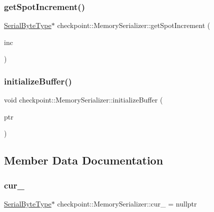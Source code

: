 \subsubsection{\texorpdfstring{get\+Spot\+Increment()}{getSpotIncrement()}}
{\footnotesize\ttfamily \hyperlink{namespacecheckpoint_ae57f01cdc0b81776c23b6c7c934c58f5}{Serial\+Byte\+Type}$\ast$ checkpoint\+::\+Memory\+Serializer\+::get\+Spot\+Increment (\begin{DoxyParamCaption}\item[{\hyperlink{namespacecheckpoint_a083f6674da3f94c2901b18c6d238217c}{Serial\+Size\+Type} const}]{inc }\end{DoxyParamCaption})\hspace{0.3cm}{\ttfamily [inline]}}

\mbox{\label{structcheckpoint_1_1_memory_serializer_a449eb24e2136febd621983d26e21a4ed}} 
\subsubsection{\texorpdfstring{initialize\+Buffer()}{initializeBuffer()}}
{\footnotesize\ttfamily void checkpoint\+::\+Memory\+Serializer\+::initialize\+Buffer (\begin{DoxyParamCaption}\item[{\hyperlink{namespacecheckpoint_ae57f01cdc0b81776c23b6c7c934c58f5}{Serial\+Byte\+Type} $\ast$const}]{ptr }\end{DoxyParamCaption})\hspace{0.3cm}{\ttfamily [inline]}}



\subsection{Member Data Documentation}
\mbox{\label{structcheckpoint_1_1_memory_serializer_ab1f121effff21997447187346bbd8237}} 
\subsubsection{\texorpdfstring{cur\+\_\+}{cur\_}}
{\footnotesize\ttfamily \hyperlink{namespacecheckpoint_ae57f01cdc0b81776c23b6c7c934c58f5}{Serial\+Byte\+Type}$\ast$ checkpoint\+::\+Memory\+Serializer\+::cur\+\_\+ = nullptr\hspace{0.3cm}{\ttfamily [protected]}}


